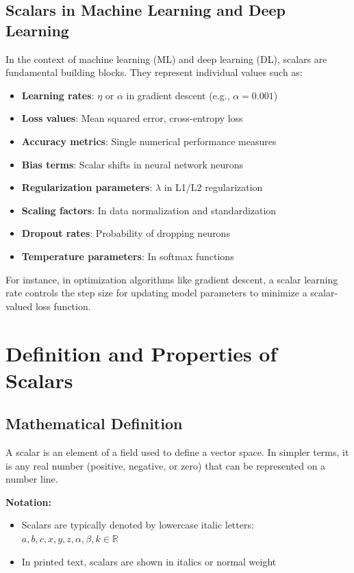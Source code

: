 \documentclass[11pt,a4paper]{article}
\begin{document}
\subsection{Scalars in Machine Learning and Deep Learning}

In the context of machine learning (ML) and deep learning (DL), scalars are fundamental building blocks. They represent individual values such as:

\begin{itemize}
    \item \textbf{Learning rates}: $\eta$ or $\alpha$ in gradient descent (e.g., $\alpha = 0.001$)
    \item \textbf{Loss values}: Mean squared error, cross-entropy loss
    \item \textbf{Accuracy metrics}: Single numerical performance measures
    \item \textbf{Bias terms}: Scalar shifts in neural network neurons
    \item \textbf{Regularization parameters}: $\lambda$ in L1/L2 regularization
    \item \textbf{Scaling factors}: In data normalization and standardization
    \item \textbf{Dropout rates}: Probability of dropping neurons
    \item \textbf{Temperature parameters}: In softmax functions
\end{itemize}

For instance, in optimization algorithms like gradient descent, a scalar learning rate controls the step size for updating model parameters to minimize a scalar-valued loss function.

\section{Definition and Properties of Scalars}

\subsection{Mathematical Definition}

A scalar is an element of a field used to define a vector space. In simpler terms, it is any real number (positive, negative, or zero) that can be represented on a number line.

\textbf{Notation:}
\begin{itemize}
    \item Scalars are typically denoted by lowercase italic letters: $a, b, c, x, y, z, \alpha, \beta, k \in \mathbb{R}$
    \item In printed text, scalars are shown in italics or normal weight
\end{itemize}
\end{document}
